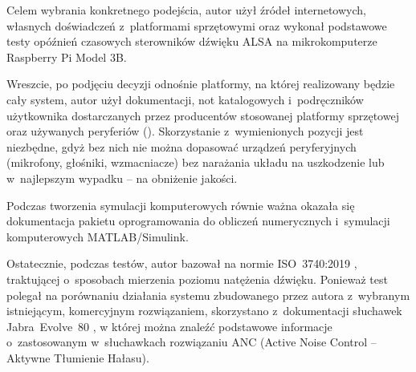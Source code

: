 Celem wybrania konkretnego podejścia, autor użył źródeł internetowych, własnych doświadczeń z~platformami sprzętowymi oraz wykonał podstawowe testy opóźnień czasowych sterowników dźwięku ALSA na mikrokomputerze Raspberry Pi Model 3B.

Wreszcie, po podjęciu decyzji odnośnie platformy, na której realizowany będzie cały system, autor użył dokumentacji, not katalogowych i~podręczników użytkownika dostarczanych przez producentów stosowanej platformy sprzętowej oraz używanych peryferiów (\cite{speakeropamp, RM0390}). Skorzystanie z~wymienionych pozycji jest niezbędne, gdyż bez nich nie można dopasować urządzeń peryferyjnych (mikrofony, głośniki, wzmacniacze) bez narażania układu na uszkodzenie lub w~najlepszym wypadku -- na obniżenie jakości.

Podczas tworzenia symulacji komputerowych równie ważna okazała się dokumentacja pakietu oprogramowania do obliczeń numerycznych i~symulacji komputerowych MATLAB/Simulink. 

Ostatecznie, podczas testów, autor bazował na normie ISO~3740:2019 \cite{test_norm}, traktującej o~sposobach mierzenia poziomu natężenia dźwięku. Ponieważ test polegał na porównaniu działania systemu zbudowanego przez autora z~wybranym istniejącym, komercyjnym rozwiązaniem, skorzystano z~dokumentacji słuchawek Jabra~Evolve~80 \cite{JabraEvolve80}, w której można znaleźć podstawowe informacje o~zastosowanym w~słuchawkach rozwiązaniu ANC (Active Noise Control -- Aktywne Tłumienie Hałasu).
